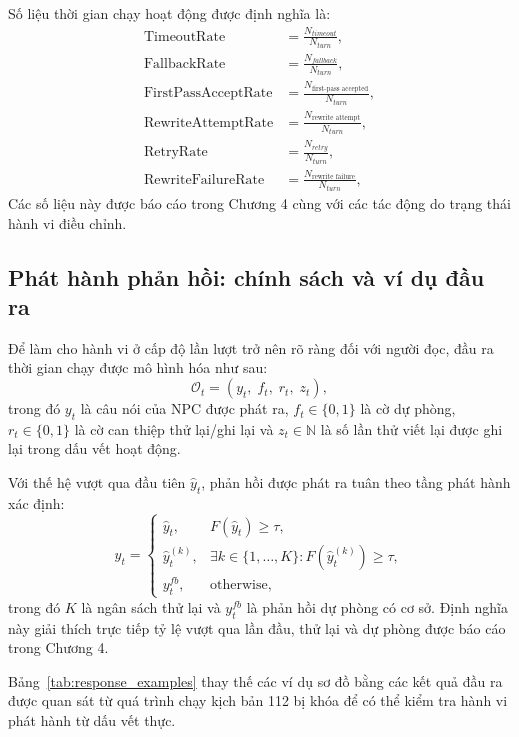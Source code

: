 ﻿\documentclass[a4paper,12pt]{article}
\begin{document}
Số liệu thời gian chạy hoạt động được định nghĩa là:
\begin{align}
\mathrm{TimeoutRate} &= \frac{N_{timeout}}{N_{turn}},\\
\mathrm{FallbackRate} &= \frac{N_{fallback}}{N_{turn}},\\
\mathrm{FirstPassAcceptRate} &= \frac{N_{\text{first-pass accepted}}}{N_{turn}},\\
\mathrm{RewriteAttemptRate} &= \frac{N_{\text{rewrite attempt}}}{N_{turn}},\\
\mathrm{RetryRate} &= \frac{N_{retry}}{N_{turn}},\\
\mathrm{RewriteFailureRate} &= \frac{N_{\text{rewrite failure}}}{N_{turn}},
\end{align}
Các số liệu này được báo cáo trong Chương 4 cùng với các tác động do trạng thái hành vi điều chỉnh.

\subsection{Phát hành phản hồi: chính sách và ví dụ đầu ra}
Để làm cho hành vi ở cấp độ lần lượt trở nên rõ ràng đối với người đọc, đầu ra thời gian chạy được mô hình hóa như sau:
\begin{equation}
\mathcal{O}_t=\left(y_t,\;f_t,\;r_t,\;z_t\right),
\end{equation}
trong đó \(y_t\) là câu nói của NPC được phát ra, \(f_t\in\{0,1\}\) là cờ dự phòng, \(r_t\in\{0,1\}\) là cờ can thiệp thử lại/ghi lại và \(z_t\in\mathbb{N}\) là số lần thử viết lại được ghi lại trong dấu vết hoạt động.

Với thế hệ vượt qua đầu tiên \(\hat{y}_t\), phản hồi được phát ra tuân theo tầng phát hành xác định:
\begin{equation}
y_t=
\begin{cases}
\hat{y}_t, & F(\hat{y}_t)\ge\tau,\\
\hat{y}^{(k)}_t, & \exists k\in\{1,\dots,K\}:F(\hat{y}^{(k)}_t)\ge\tau,\\
y^{fb}_t, & \text{otherwise},
\end{cases}
\end{equation}
trong đó \(K\) là ngân sách thử lại và \(y^{fb}_t\) là phản hồi dự phòng có cơ sở. Định nghĩa này giải thích trực tiếp tỷ lệ vượt qua lần đầu, thử lại và dự phòng được báo cáo trong Chương 4.

Bảng~\ref{tab:response_examples} thay thế các ví dụ sơ đồ bằng các kết quả đầu ra được quan sát từ quá trình chạy kịch bản 112 bị khóa để có thể kiểm tra hành vi phát hành từ dấu vết thực.
\end{document}
